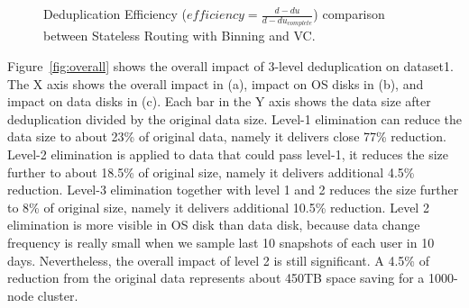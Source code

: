 \begin{figure}[ht]
  \centering
    \caption{Deduplication Efficiency
        ($efficiency=\frac{d-du}{d-du_{complete}}$) comparison between
    Stateless Routing with Binning and VC.}
  \label{fig-exbin-efficiency-graph}
\end{figure}


Figure~\ref{fig:overall} shows the overall impact of 3-level deduplication on dataset1.
The X axis shows the overall impact in (a),  impact on OS disks in (b), and impact on data disks in (c).
Each bar in the Y axis shows the data size after deduplication divided by the original data size.
Level-1 elimination can reduce the data size to about 23\% of original data, namely it delivers close 77\% reduction.
Level-2 elimination is applied to data that could pass level-1, it
reduces the size further to about 18.5\% of original size, namely it delivers additional 4.5\% reduction.
Level-3 elimination together with level 1 and 2
reduces the size further to 8\% of original size, namely it delivers additional 10.5\% reduction.
Level 2 elimination is more visible in OS disk than data disk, because data change frequency is really small
when we sample last 10 snapshots of each user in 10 days. Nevertheless, the overall impact of level 2 is still significant.
A 4.5\% of reduction from the original data represents about 450TB space saving for a 1000-node cluster.


